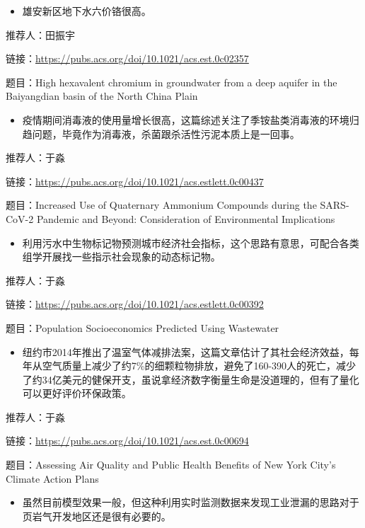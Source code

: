 \documentclass[
]{book}
\providecommand{\tightlist}{%
  \setlength{\itemsep}{0pt}\setlength{\parskip}{0pt}}
\begin{document}
\begin{itemize}
\tightlist
\item
  雄安新区地下水六价铬很高。
\end{itemize}

推荐人：田振宇

链接：\url{https://pubs.acs.org/doi/10.1021/acs.est.0c02357}

题目：High hexavalent chromium in groundwater from a deep aquifer in the Baiyangdian basin of the North China Plain

\begin{itemize}
\tightlist
\item
  疫情期间消毒液的使用量增长很高，这篇综述关注了季铵盐类消毒液的环境归趋问题，毕竟作为消毒液，杀菌跟杀活性污泥本质上是一回事。
\end{itemize}

推荐人：于淼

链接：\url{https://pubs.acs.org/doi/10.1021/acs.estlett.0c00437}

题目：Increased Use of Quaternary Ammonium Compounds during the SARS-CoV-2 Pandemic and Beyond: Consideration of Environmental Implications

\begin{itemize}
\tightlist
\item
  利用污水中生物标记物预测城市经济社会指标，这个思路有意思，可配合各类组学开展找一些指示社会现象的动态标记物。
\end{itemize}

推荐人：于淼

链接：\url{https://pubs.acs.org/doi/10.1021/acs.estlett.0c00392}

题目：Population Socioeconomics Predicted Using Wastewater

\begin{itemize}
\tightlist
\item
  纽约市2014年推出了温室气体减排法案，这篇文章估计了其社会经济效益，每年从空气质量上减少了约7\%的细颗粒物排放，避免了160-390人的死亡，减少了约34亿美元的健保开支，虽说拿经济数字衡量生命是没道理的，但有了量化可以更好评价环保政策。
\end{itemize}

推荐人：于淼

链接：\url{https://pubs.acs.org/doi/10.1021/acs.est.0c00694}

题目：Assessing Air Quality and Public Health Benefits of New York City's Climate Action Plans

\begin{itemize}
\tightlist
\item
  虽然目前模型效果一般，但这种利用实时监测数据来发现工业泄漏的思路对于页岩气开发地区还是很有必要的。
\end{itemize}
\end{document}
